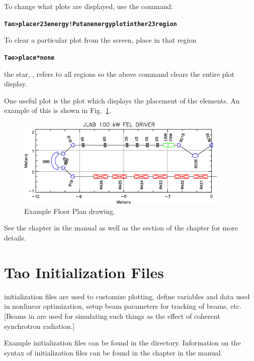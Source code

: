 \documentclass{hitec}
\newcommand{\BF}[1]{{\normalfont\textbf{#1}}}
\newenvironment{display}
  {\vspace*{-1.5ex} \begin{alltt}}
  {\end{alltt} \vspace*{-1.0ex}}
\begin{document}
To change what plots are displayed, use the  command:
\begin{display}
  \BF{Tao> place r23 energy  ! Put an energy plot in the r23 region}
\end{display}
To clear a particular plot from the screen, place  in that region
\begin{display}
  \BF{Tao> place * none}
\end{display}
the star, \vn{*}, refers to all regions so the above command clears the entire plot
display.

One useful plot is the  plot which displays the placement of the elements.
An example of this is shown in Fig.~\ref{f:floor.plan}.

\begin{figure}
  \centering
  \includegraphics[width=4in]{floor-plan.pdf}
  \caption{Example Floor Plan drawing.}
  \label{f:floor.plan}
\end{figure}

See the  chapter in the \tao manual as well as the  section of the  chapter for more details. 

\section{Tao Initialization Files}
\label{s:tao.init}

\tao initialization files are used to customize plotting, define variables and data used
in nonlinear optimization, setup beam parameters for tracking of beams, etc. [Beams in
\tao are used for simulating such things as the effect of coherent synchrotron radiation.]

Example initialization files can be found in the  directory. Information
on the syntax of initialization files can be found in the  chapter
in the  manual.

\end{document}
